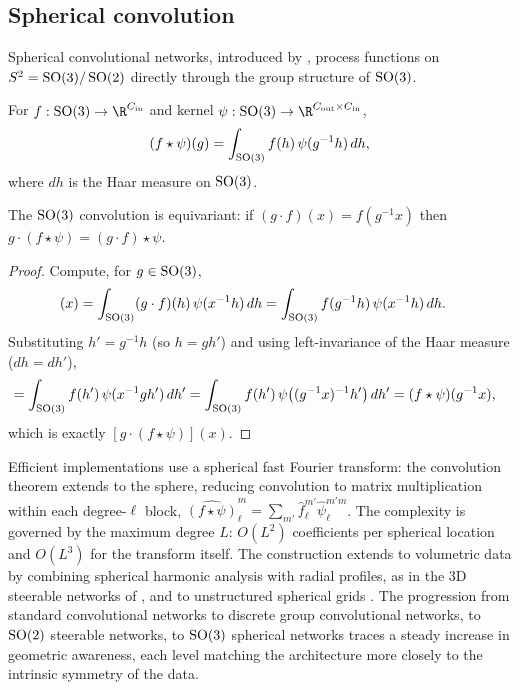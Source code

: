 \subsection{Spherical convolution}
\label{sec:groups:spherical-convolution}

Spherical convolutional networks, introduced by \citet{cohen2018sphericalcnns},
process functions on $S^2 = \operatorname{SO}(3)/\operatorname{SO}(2)$ directly through the group structure
of $\SO(3)$.

\begin{definition}[$\SO(3)$ convolution]
\label{def:groups:so3-convolution}
For $f: \SO(3) \to \R^{C_{\text{in}}}$ and kernel $\psi: \SO(3) \to
\R^{C_{\text{out}} \times C_{\text{in}}}$,
\begin{equation}
  (f \star \psi)(g) = \int_{\operatorname{SO}(3)} f(h)\, \psi(g^{-1} h)\, dh,
\end{equation}
where $dh$ is the Haar measure on $\SO(3)$.
\end{definition}

\begin{theorem}
\label{thm:groups:spherical-conv-equivariance}
The $\SO(3)$ convolution is equivariant: if $(g \cdot f)(x) = f(g^{-1} x)$ then
$g \cdot (f \star \psi) = (g \cdot f) \star \psi$.
\end{theorem}

\begin{proof}
Compute, for $g \in \operatorname{SO}(3)$,
\begin{align}
  [(g \cdot f) \star \psi](x)
  &= \int_{\SO(3)} (g \cdot f)(h)\, \psi(x^{-1} h)\, dh
   = \int_{\SO(3)} f(g^{-1} h)\, \psi(x^{-1} h)\, dh.
\end{align}
Substituting $h' = g^{-1} h$ (so $h = g h'$) and using left-invariance of the
Haar measure ($dh = dh'$),
\begin{align}
  &= \int_{\operatorname{SO}(3)} f(h')\, \psi(x^{-1} g h')\, dh'
   = \int_{\operatorname{SO}(3)} f(h')\, \psi\big((g^{-1} x)^{-1} h'\big)\, dh'
   = (f \star \psi)(g^{-1} x),
\end{align}
which is exactly $[g \cdot (f \star \psi)](x)$.
\end{proof}

Efficient implementations use a spherical fast Fourier transform: the convolution
theorem extends to the sphere, reducing convolution to matrix multiplication
within each degree-$\ell$ block, $\widehat{(f \star \psi)}_\ell^m = \sum_{m'}
\hat f_\ell^{m'} \hat\psi_\ell^{m'm}$. The complexity is governed by the maximum
degree $L$: $O(L^2)$ coefficients per spherical location and $O(L^3)$ for the
transform itself. The construction extends to volumetric data by combining
spherical harmonic analysis with radial profiles, as in the 3D steerable
networks of \citet{weiler2018steerable}, and to unstructured spherical grids
\citep{cohen2021spherical}. The progression from standard convolutional networks
to discrete group convolutional networks, to $\operatorname{SO}(2)$ steerable networks, to
$\SO(3)$ spherical networks traces a steady increase in geometric awareness,
each level matching the architecture more closely to the intrinsic symmetry of
the data.

